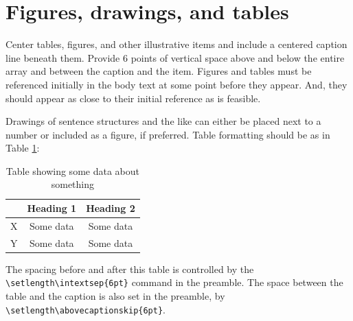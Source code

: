 \documentclass[12pt, letterpaper]{article}
\begin{document}
    \section{Figures, drawings, and tables}

    Center tables, figures, and other illustrative items and include a centered
    caption line beneath them. Provide 6 points of vertical space above and below
    the entire array and between the caption and the item. Figures and tables
    must be referenced initially in the body text at some point before they
    appear. And, they should appear as close to their initial reference as is
    feasible.

    Drawings of sentence structures and the like can either be placed next to a
    number or included as a figure, if preferred. Table formatting should be as
    in Table \ref{t:table}:

    \begin{table}[h]
        \centering
        \begin{tabular}{l c c}
              & Heading 1 & Heading 2 \\
            \hline
            X & Some data & Some data \\
            Y & Some data & Some data \\
            \hline
        \end{tabular}
        \caption{Table showing some data about something \label{t:table}}
    \end{table}

    \noindent
    The spacing before and after this table is controlled by the \verb=\setlength\intextsep{6pt}=
    command in the preamble. The space between the table and the caption is also
    set in the preamble, by \verb=\setlength\abovecaptionskip{6pt}=.
\end{document}
